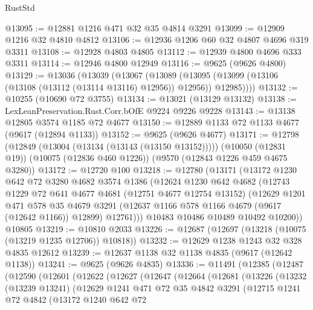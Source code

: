 \begin{lexlean}{RustStd}
\begin{coremodule}
@13095 := @12881 @1216 @471 @32 @35 @4814 @3291
@13099 := @12909 @1216 @32 @4810 @4812
@13106 := @12936 @1206 @60 @32 @4807 @4696 @319 @3311
@13108 := @12928 @4803 @4805
@13112 := @12939 @4800 @4696 @333 @3311
@13114 := @12946 @4800 @12949
@13116 := @9625 (@9626 @4800)
@13129 := @13036
    (@13039
      (@13067
        (@13089 (@13095 (@13099 (@13106 (@13108 (@13112 (@13114 @13116) @12956)) @12956)) @12985))))
@13132 := @10255 (@10690 @72 @3755)
@13134 := @13021 (@13129 @13132)
@13138 := LexLeanPreservation.Rust.Corr.bOfE @9224 @9226 @9228
@13143 := @13138 @12805 @3574 @1185 @72 @4677
@13150 := @12889 @1133 @72 @1133 @4677 (@9617 (@12894 @1133))
@13152 := @9625 (@9626 @4677)
@13171 := @12798
    (@12849 (@13004 (@13134 (@13143 (@13150 @13152)))))
    (@10050 (@12831 @19))
    (@10075 (@12836 @460 @1226))
    (@9570 (@12843 @1226 @459 @4675 @3280))
@13172 := @12720 @100
@13218 := @12780
    (@13171
      (@13172
        @1230
        @642
        @72
        @3280
        @4682
        @3574
        @1386
        (@12624
          @1230
          @642
          @4682
          (@12743
            @1229
            @72
            @641
            @4677
            @4681
            (@12751 @4677 @12754 @13152)
            (@12629
              @1201
              @471
              @578
              @35
              @4679
              @3291
              (@12637 @1166 @578 @1166 @4679 (@9617 (@12642 @1166)) @12899)
              @12761)))
        @10483
        @10486
        @10489
        @10492
        @10200))
    @10805
@13219 := @10810 @2033
@13226 := @12687 (@12697 (@13218 (@10075 (@13219 @1235 @12706)) @10818))
@13232 := @12629 @1238 @1243 @32 @328 @4835 @12612
@13239 := @12637 @1138 @32 @1138 @4835 (@9617 (@12642 @1138))
@13241 := @9625 (@9626 @4835)
@13336 := @11491
    (@12385
      (@12487
        (@12590
          (@12601
            (@12622
              (@12627
                (@12647
                  (@12664
                    (@12681
                      (@13226
                        (@13232
                          (@13239 @13241)
                          (@12629
                            @1241
                            @471
                            @72
                            @35
                            @4842
                            @3291
                            (@12715
                              @1241
                              @72
                              @4842
                              (@13172
                                @1240
                                @642
                                @72

\end{coremodule}
\end{lexlean}
